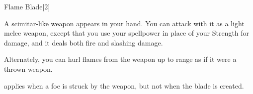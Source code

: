 \begin{spellsection}{Flame Blade}[2]
    \begin{spellheader}
    \end{spellheader}
    \begin{spellcontent}
        \begin{spelleffects}
            \spelleffect A scimitar-like weapon appears in your hand. You can attack with it as a light melee weapon, except that you use your spellpower in place of your Strength for damage, and it deals both fire and slashing damage.

            Alternately, you can hurl flames from the weapon up to \rngmed range as if it were a thrown weapon.
            \spelldur \durlong \dismissable
        \end{spelleffects}
    \end{spellcontent}
    \begin{spellfooter}
        \spellnotes {} applies when a foe is struck by the weapon, but not when the blade is created.
        \firespellnotes
        \miscastexplode
    \end{spellfooter}
    \begin{spellaugments}
    \end{spellaugments}
\end{spellsection}

